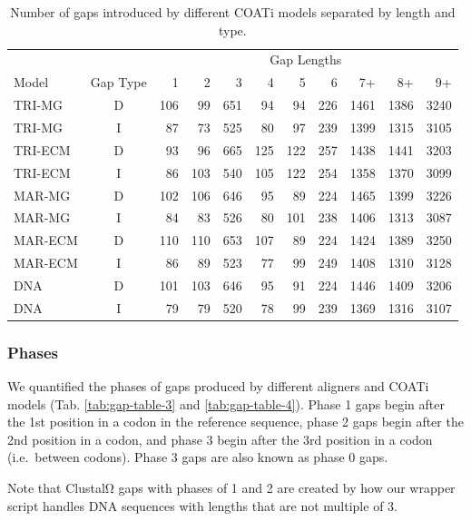 \documentclass[
]{article}
\begin{document}
\begin{table}[H]

\caption{\label{tab:gap-table-2}Number of gaps introduced by different COATi models separated by length and type.}
\centering
\begin{tabular}[t]{lcrrrrrrrrr}
\toprule
\multicolumn{2}{c}{ } & \multicolumn{9}{c}{Gap Lengths} \\
\cmidrule(l{3pt}r{3pt}){3-11}
Model & Gap Type & 1 & 2 & 3 & 4 & 5 & 6 & 7+ & 8+ & 9+\\
\midrule
TRI-MG & D & 106 & 99 & 651 & 94 & 94 & 226 & 1461 & 1386 & 3240\\
TRI-MG & I & 87 & 73 & 525 & 80 & 97 & 239 & 1399 & 1315 & 3105\\
\addlinespace
TRI-ECM & D & 93 & 96 & 665 & 125 & 122 & 257 & 1438 & 1441 & 3203\\
TRI-ECM & I & 86 & 103 & 540 & 105 & 122 & 254 & 1358 & 1370 & 3099\\
\addlinespace
MAR-MG & D & 102 & 106 & 646 & 95 & 89 & 224 & 1465 & 1399 & 3226\\
MAR-MG & I & 84 & 83 & 526 & 80 & 101 & 238 & 1406 & 1313 & 3087\\
\addlinespace
MAR-ECM & D & 110 & 110 & 653 & 107 & 89 & 224 & 1424 & 1389 & 3250\\
MAR-ECM & I & 86 & 89 & 523 & 77 & 99 & 249 & 1408 & 1310 & 3128\\
\addlinespace
DNA & D & 101 & 103 & 646 & 95 & 91 & 224 & 1446 & 1409 & 3206\\
DNA & I & 79 & 79 & 520 & 78 & 99 & 239 & 1369 & 1316 & 3107\\
\bottomrule
\end{tabular}
\end{table}

\hypertarget{phases}{%
\subsubsection{Phases}\label{phases}}

We quantified the phases of gaps produced by different aligners and COATi models (Tab. \ref{tab:gap-table-3} and \ref{tab:gap-table-4}). Phase 1 gaps begin after the 1st position in a codon in the reference sequence, phase 2 gaps begin after the 2nd position in a codon, and phase 3 begin after the 3rd position in a codon (i.e.~between codons). Phase 3 gaps are also known as phase 0 gaps.

Note that ClustalΩ gaps with phases of 1 and 2 are created by how our wrapper script handles DNA sequences with lengths that are not multiple of 3.
\end{document}
